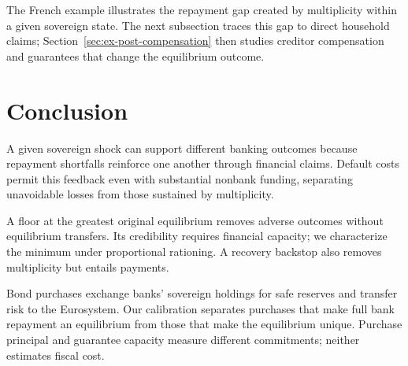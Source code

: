 \documentclass[preprint,12pt,authoryear]{elsarticle}
\begin{document}
\begin{figure}[htbp]
\centering
{}
\label{fig:french-default-balance-sheets}



\par\smallskip

\end{figure}


The French example illustrates the repayment gap created by multiplicity within a given sovereign state. The next subsection traces this gap to direct household claims; Section~\ref{sec:ex-post-compensation} then studies creditor compensation and guarantees that change the equilibrium outcome.









\section{Conclusion}\label{sec:conclusion}

A given sovereign shock can support different banking outcomes because repayment shortfalls reinforce one another through financial claims. Default costs permit this feedback even with substantial nonbank funding, separating unavoidable losses from those sustained by multiplicity.

A floor at the greatest original equilibrium removes adverse outcomes without equilibrium transfers. Its credibility requires financial capacity; we characterize the minimum under proportional rationing. A recovery backstop also removes multiplicity but entails payments.

Bond purchases exchange banks' sovereign holdings for safe reserves and transfer risk to the Eurosystem. Our calibration separates purchases that make full bank repayment an equilibrium from those that make the equilibrium unique. Purchase principal and guarantee capacity measure different commitments; neither estimates fiscal cost.
\end{document}
